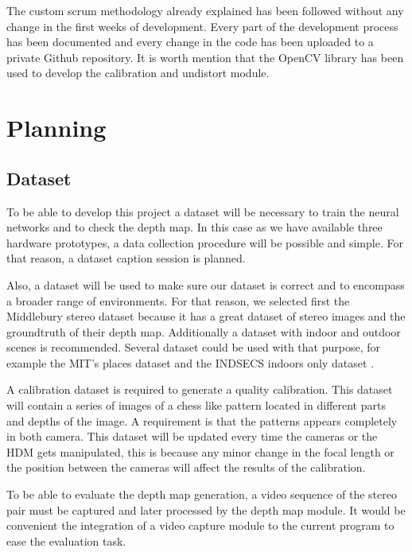 \documentclass[10pt,a4paper,twocolumn,twoside]{article}
\begin{document}
	The custom scrum methodology already explained has been followed without any change in the first weeks of development. Every part of the development process has been documented and every change in the code has been uploaded to a private Github repository. It is worth mention that the OpenCV \cite{web:opencv} library has been used to develop the calibration and undistort module. 
	
	\section{Planning}
	\label{sec:planning}
	
	\subsection{Dataset}
	\label{subsec:dataset}
	To be able to develop this project a dataset will be necessary to train the neural networks and to check the depth map. In this case as we have available three hardware prototypes, a data collection procedure will be possible and simple. For that reason, a dataset caption session is planned.
	
	Also, a dataset will be used to make sure our dataset is correct and to encompass a broader range of environments. For that reason, we selected first the Middlebury stereo dataset \cite{web:middelburyDataset} because it has a great dataset of stereo images and the groundtruth of their depth map. Additionally a dataset with indoor and outdoor scenes is recommended. Several dataset could be used with that purpose, for example the MIT's places dataset \cite{web:mitplaces} and the INDSECS indoors only dataset \cite{web:indecs}.
	
	A calibration dataset is required to generate a quality calibration. This dataset will contain a series of images of a chess like pattern located in different parts and depths of the image. A requirement is that the patterns appears completely in both camera. This dataset will be updated every time the cameras or the HDM gets manipulated, this is because any minor change in the focal length or the position between the cameras will affect the results of the calibration.
	
	To be able to evaluate the depth map generation, a video sequence of the stereo pair must be captured and later processed by the depth map module. It would be convenient the integration of a video capture module to the current program to ease the evaluation task.
	
\end{document}
